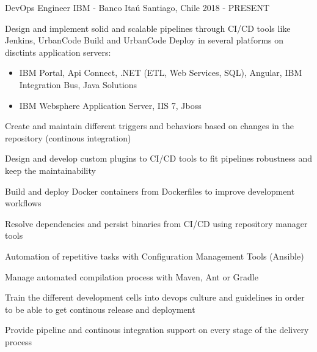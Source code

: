 

\begin{cventries}

  \cventry
  {DevOps Engineer} %
  {IBM - Banco Itaú} %
  {Santiago, Chile} %
  {2018 - PRESENT} %
  {
    \begin{cvitems} %
      \item {Design and implement solid and scalable pipelines through CI/CD tools like Jenkins, UrbanCode Build and UrbanCode Deploy in several platforms on disctints application servers:}
        \begin{itemize}
          \item {IBM Portal, Api Connect, .NET (ETL, Web Services, SQL), Angular, IBM Integration Bus, Java Solutions}
          \item {IBM Websphere Application Server, IIS 7, Jboss}
        \end{itemize}
      \item {Create and maintain different triggers and behaviors based on changes in the repository (continous integration) }
      \item {Design and develop custom plugins to CI/CD tools to fit pipelines robustness and keep the maintainability}
      \item {Build and deploy Docker containers from Dockerfiles to improve development workflows}
      \item {Resolve dependencies and persist binaries from CI/CD using repository manager tools}
      \item {Automation of repetitive tasks with Configuration Management Tools (Ansible)}
      \item {Manage automated compilation process with Maven, Ant or Gradle}
      \item {Train the different development cells into devops culture and guidelines in order to be able to get continous release and deployment}
      \item {Provide pipeline and continous integration support on every stage of the delivery process}

\end{cvitems}}
\end{cventries}
